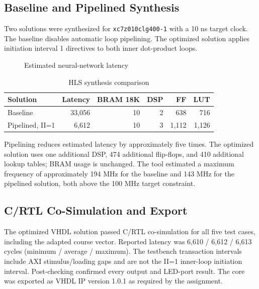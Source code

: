\documentclass[11pt,a4paper]{article}
\begin{document}
\subsection{Baseline and Pipelined Synthesis}
Two solutions were synthesized for \texttt{xc7z010clg400-1} with a 10 ns target
clock. The baseline disables automatic loop pipelining. The optimized solution
applies initiation interval 1 directives to both inner dot-product loops.

\begin{figure}[H]
\centering
{}
\caption{Estimated neural-network latency}
\end{figure}

\begin{table}[H]
\centering
\caption{HLS synthesis comparison}
\begin{tabular}{lrrrrr}
\toprule
\textbf{Solution} & \textbf{Latency} & \textbf{BRAM 18K} & \textbf{DSP} & \textbf{FF} & \textbf{LUT} \\
\midrule
Baseline & 33,056 & 10 & 2 & 638 & 716 \\
Pipelined, II=1 & 6,612 & 10 & 3 & 1,112 & 1,126 \\
\bottomrule
\end{tabular}
\end{table}

Pipelining reduces estimated latency by approximately five times. The optimized
solution uses one additional DSP, 474 additional flip-flops, and 410 additional
lookup tables; BRAM usage is unchanged. The tool estimated a maximum frequency
of approximately 194 MHz for the baseline and 143 MHz for the pipelined solution,
both above the 100 MHz target constraint.

\subsection{C/RTL Co-Simulation and Export}
The optimized VHDL solution passed C/RTL co-simulation for all five test cases,
including the adapted course vector. Reported latency was 6,610 / 6,612 / 6,613
cycles (minimum / average / maximum). The testbench transaction intervals include
AXI stimulus/loading gaps and are not the II=1 inner-loop initiation interval.
Post-checking confirmed every output and LED-port result. The core was
exported as VHDL IP version 1.0.1 as required by the assignment.
\end{document}
